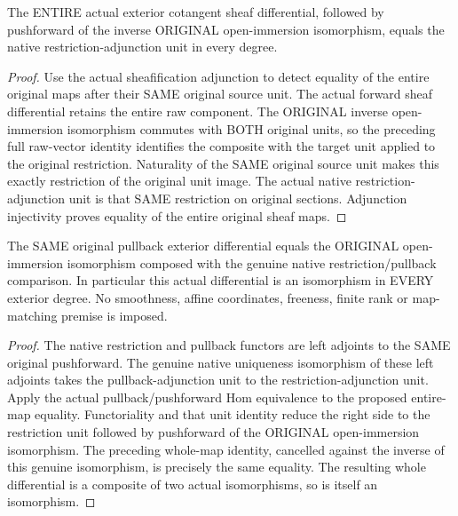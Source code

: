 \begin{lemma}\label{sc0-open-differential:sheaf-unit}
\leanok
{}
The ENTIRE actual exterior cotangent sheaf differential, followed by pushforward of the inverse ORIGINAL open-immersion isomorphism, equals the native restriction-adjunction unit in every degree.
\end{lemma}
\begin{proof}
Use the actual sheafification adjunction to detect equality of the entire original maps after their SAME original source unit. The actual forward sheaf differential retains the entire raw component. The ORIGINAL inverse open-immersion isomorphism commutes with BOTH original units, so the preceding full raw-vector identity identifies the composite with the target unit applied to the original restriction. Naturality of the SAME original source unit makes this exactly restriction of the original unit image. The actual native restriction-adjunction unit is that SAME restriction on original sections. Adjunction injectivity proves equality of the entire original sheaf maps.
\end{proof}

\begin{theorem}\label{sc0-open-differential:pullback-isomorphism}
\leanok
{}
The SAME original pullback exterior differential equals the ORIGINAL open-immersion isomorphism composed with the genuine native restriction/pullback comparison. In particular this actual differential is an isomorphism in EVERY exterior degree. No smoothness, affine coordinates, freeness, finite rank or map-matching premise is imposed.
\end{theorem}
\begin{proof}
The native restriction and pullback functors are left adjoints to the SAME original pushforward. The genuine native uniqueness isomorphism of these left adjoints takes the pullback-adjunction unit to the restriction-adjunction unit. Apply the actual pullback/pushforward Hom equivalence to the proposed entire-map equality. Functoriality and that unit identity reduce the right side to the restriction unit followed by pushforward of the ORIGINAL open-immersion isomorphism. The preceding whole-map identity, cancelled against the inverse of this genuine isomorphism, is precisely the same equality. The resulting whole differential is a composite of two actual isomorphisms, so is itself an isomorphism.
\end{proof}
